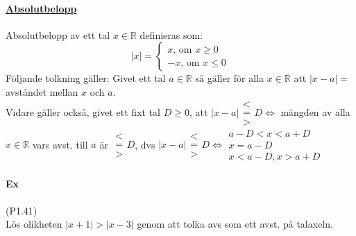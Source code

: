 \paragraph{\underline{Absolutbelopp}}
Absolutbelopp av ett tal $x\in\mathbb{R}$ definieras som:
\begin{equation*}
    |x|=
    \left\{\begin{matrix}
        x \text{, om } x\geq 0 \\
        -x \text{, om } x\leq 0
    \end{matrix}
    \right.
\end{equation*}
Följande tolkning gäller:
Givet ett tal $a\in\mathbb{R}$ så gäller för alla $x\in\mathbb{R}$ att $|x-a|=$ avståndet mellan $x$ och $a$.\\
Vidare gäller också, givet ett fixt tal $D\geq 0$, att
$|x-a|\begin{matrix}< \\=\\>\end{matrix}D\Leftrightarrow$
mängden av alla $x\in\mathbb{R}$ vars avst. till $a$ är $\begin{matrix}<\\=\\>\end{matrix}D$,
dvs $|x-a|\begin{matrix}< \\=\\>\end{matrix}D\Leftrightarrow\begin{matrix}
        a-D<x<a+D \\
        x=a-D     \\
        x<a-D,x>a+D
    \end{matrix}$

\clearpage

\paragraph{Ex} (P1.41)\\
Lös olikheten $|x+1| >|x-3|$ genom att tolka avs som ett avst. på talaxeln.

